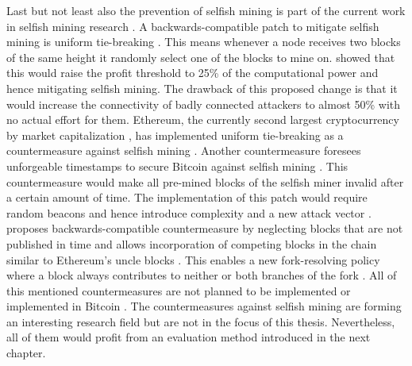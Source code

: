 Last but not least also the prevention of selfish mining is part of the current work in selfish mining research \cite{eyal2014majority, billah2015one, solat2016zeroblock, zhang2017publish}.
A backwards-compatible patch to mitigate selfish mining is uniform tie-breaking \cite{eyal2014majority}.
This means whenever a node receives two blocks of the same height it randomly select one of the blocks to mine on.
\cite{eyal2014majority} showed that this would raise the profit threshold to 25\% of the computational power and hence mitigating selfish mining.
The drawback of this proposed change is that it would increase the connectivity of badly connected attackers to almost 50\% with no actual effort for them.
Ethereum, the currently second largest cryptocurrency by market capitalization \cite{marketcap2017}, has implemented uniform tie-breaking as a countermeasure against selfish mining \cite{gervais2016security, unifromtiebreakingethereum}.
Another countermeasure foresees unforgeable timestamps to secure Bitcoin against selfish mining \cite{billah2015one}.
This countermeasure would make all pre-mined blocks of the selfish miner invalid after a certain amount of time.
The implementation of this patch would require random beacons and hence introduce complexity and a new attack vector \cite{billah2015one}.
\cite{zhang2017publish} proposes backwards-compatible countermeasure by neglecting blocks that are not published in time and allows incorporation of competing blocks in the chain similar to Ethereum's uncle blocks \cite{wood2014ethereum}.
This enables a new fork-resolving policy where a block always contributes to neither or both branches of the fork \cite{zhang2017publish}.
All of this mentioned countermeasures are not planned to be implemented or implemented in Bitcoin \cite{bitcoin, bitcoinbip}.
The countermeasures against selfish mining are forming an interesting research field but are not in the focus of this thesis.
Nevertheless, all of them would profit from an evaluation method introduced in the next chapter.
